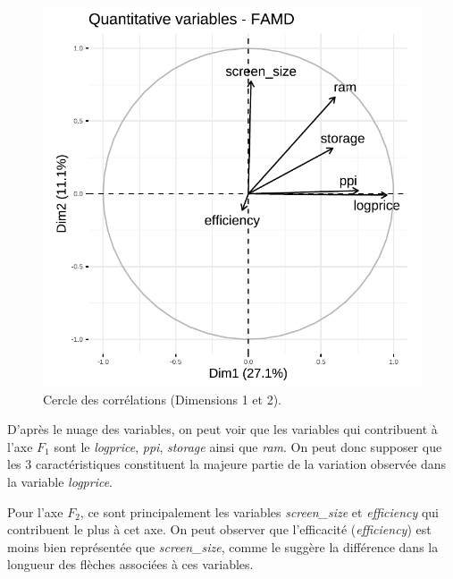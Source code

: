 \documentclass[
  12pt,
]{report}
\begin{document}
\begin{figure}[H]

{\centering \includegraphics{report_files/figure-pdf/unnamed-chunk-17-1.pdf}

}

\caption{Cercle des corrélations (Dimensions 1 et 2).}

\end{figure}%

D'après le nuage des variables, on peut voir que les variables qui
contribuent à l'axe \(F_1\) sont le \emph{logprice}, \emph{ppi},
\emph{storage} ainsi que \emph{ram}. On peut donc supposer que les 3
caractéristiques constituent la majeure partie de la variation observée
dans la variable \emph{logprice}.

Pour l'axe \(F_2\), ce sont principalement les variables
\emph{screen\_size} et \emph{efficiency} qui contribuent le plus à cet
axe. On peut observer que l'efficacité (\emph{efficiency}) est moins
bien représentée que \emph{screen\_size}, comme le suggère la différence
dans la longueur des flèches associées à ces variables.
\end{document}
